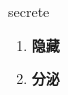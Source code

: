 
\begin{frame}
{\huge secrete}
\begin{center}
\begin{enumerate}\Large
  \item \textbf{隐藏}
  \item \textbf{分泌}
\end{enumerate}
\end{center}
\end{frame}
